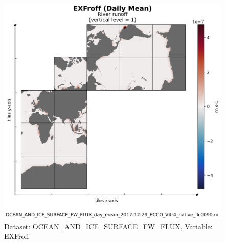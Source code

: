 \begin{figure}[H]
\centering
\includegraphics[scale=0.55]{../images/plots/v4r4/native_plots/Ocean_and_Sea-Ice_Surface_Freshwater_Fluxes/EXFroff.png}
\caption{Dataset: OCEAN\_AND\_ICE\_SURFACE\_FW\_FLUX, Variable: EXFroff}
\label{tab:table-OCEAN_AND_ICE_SURFACE_FW_FLUX_EXFroff-Plot}
\end{figure}
\newpage
\pagebreak
